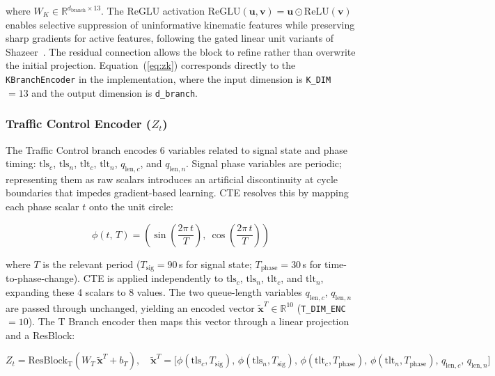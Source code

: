 \documentclass[journal]{IEEEtran}
\begin{document}
where $W_K \in \mathbb{R}^{d_\text{branch} \times 13}$.
The ReGLU activation $\text{ReGLU}(\mathbf{u}, \mathbf{v}) = \mathbf{u} \odot \text{ReLU}(\mathbf{v})$ enables selective suppression of uninformative kinematic features while preserving sharp gradients for active features, following the gated linear unit variants of Shazeer~\cite{Shazeer2020GLU}.
The residual connection allows the block to refine rather than overwrite the initial projection.
Equation~(\ref{eq:zk}) corresponds directly to the \texttt{KBranchEncoder} in the implementation, where the input dimension is \texttt{K\_DIM}~$= 13$ and the output dimension is \texttt{d\_branch}.

\subsubsection{Traffic Control Encoder ($Z_t$)}

The Traffic Control branch encodes 6 variables related to signal state and phase timing: $\text{tls}_c$, $\text{tls}_n$, $\text{tlt}_c$, $\text{tlt}_n$, $q_{\text{len},c}$, and $q_{\text{len},n}$.
Signal phase variables are periodic; representing them as raw scalars introduces an artificial discontinuity at cycle boundaries that impedes gradient-based learning.
CTE resolves this by mapping each phase scalar $t$ onto the unit circle:

\begin{equation}
\phi(t,\, T) = \left(\sin\!\left(\frac{2\pi\, t}{T}\right),\ \cos\!\left(\frac{2\pi\, t}{T}\right)\right)
\label{eq:cte}
\end{equation}

where $T$ is the relevant period ($T_\text{sig} = 90$\,s for signal state; $T_\text{phase} = 30$\,s for time-to-phase-change).
CTE is applied independently to $\text{tls}_c$, $\text{tls}_n$, $\text{tlt}_c$, and $\text{tlt}_n$, expanding these 4 scalars to 8 values.
The two queue-length variables $q_{\text{len},c}$, $q_{\text{len},n}$ are passed through unchanged, yielding an encoded vector $\tilde{\mathbf{x}}^T \in \mathbb{R}^{10}$ (\texttt{T\_DIM\_ENC}~$= 10$).
The T Branch encoder then maps this vector through a linear projection and a ResBlock:

\begin{equation}
Z_t = \text{ResBlock}_\text{T}\!\left(W_T\, \tilde{\mathbf{x}}^T + b_T\right), \quad
\tilde{\mathbf{x}}^T = \bigl[\phi(\text{tls}_c,T_\text{sig}),\, \phi(\text{tls}_n,T_\text{sig}),\, \phi(\text{tlt}_c,T_\text{phase}),\, \phi(\text{tlt}_n,T_\text{phase}),\, q_{\text{len},c},\, q_{\text{len},n}\bigr]
\label{eq:zt}
\end{equation}
\end{document}
